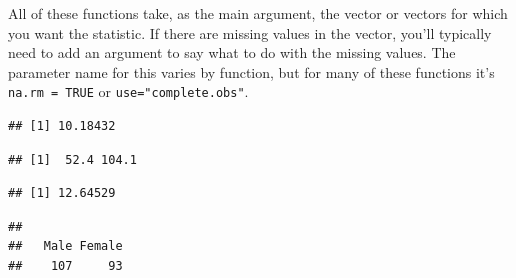 \documentclass[]{book}
\makeatletter
\newenvironment{Shaded}{\begin{snugshade}}{\end{snugshade}}
\newcommand{\KeywordTok}[1]{\textcolor[rgb]{0.13,0.29,0.53}{\textbf{#1}}}
\newcommand{\DataTypeTok}[1]{\textcolor[rgb]{0.13,0.29,0.53}{#1}}
\newcommand{\OtherTok}[1]{\textcolor[rgb]{0.56,0.35,0.01}{#1}}
\newcommand{\OperatorTok}[1]{\textcolor[rgb]{0.81,0.36,0.00}{\textbf{#1}}}
\newcommand{\NormalTok}[1]{#1}
\newenvironment{kframe}{%
\medskip{}
\setlength{\fboxsep}{.8em}
 \def\at@end@of@kframe{}%
 \ifinner\ifhmode%
  \def\at@end@of@kframe{\end{minipage}}%
  \begin{minipage}{\columnwidth}%
 \fi\fi%
 \def\FrameCommand##1{\hskip\@totalleftmargin \hskip-\fboxsep
 \colorbox{shadecolor}{##1}\hskip-\fboxsep
     \hskip-\linewidth \hskip-\@totalleftmargin \hskip\columnwidth}%
 \MakeFramed {\advance\hsize-\width
   \@totalleftmargin\z@ \linewidth\hsize
   \@setminipage}}%
 {\par\unskip\endMakeFramed%
 \at@end@of@kframe}
\renewenvironment{Shaded}{\begin{kframe}}{\end{kframe}}
\theoremstyle{definition}
\theoremstyle{definition}
\theoremstyle{definition}
\theoremstyle{remark}
\makeatother
\begin{document}
All of these functions take, as the main argument, the vector or vectors
for which you want the statistic. If there are missing values in the
vector, you'll typically need to add an argument to say what to do with
the missing values. The parameter name for this varies by function, but
for many of these functions it's \texttt{na.rm\ =\ TRUE} or
\texttt{use="complete.obs"}.

\begin{Shaded}
\end{Shaded}

\begin{verbatim}
## [1] 10.18432
\end{verbatim}

\begin{Shaded}
\end{Shaded}

\begin{verbatim}
## [1]  52.4 104.1
\end{verbatim}

\begin{Shaded}
\end{Shaded}

\begin{verbatim}
## [1] 12.64529
\end{verbatim}

\begin{Shaded}
\end{Shaded}

\begin{verbatim}
## 
##   Male Female 
##    107     93
\end{verbatim}
\end{document}
